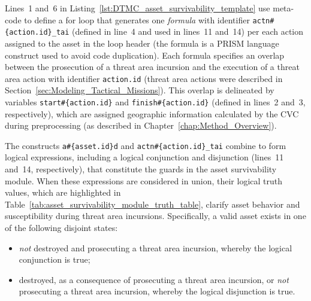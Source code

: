 Lines~1 and~6 in Listing~\ref{lst:DTMC_asset_survivability_template} use meta-code to define a for loop that generates one \emph{formula} with identifier \texttt{actn\#\{action.id\}\_tai} (defined in line~4 and used in lines~11 and~14) per each action assigned to the asset in the loop header (the formula is a PRISM language construct used to avoid code duplication). Each formula specifies an overlap between the prosecution of a threat area incursion and the execution of a threat area action with identifier \texttt{action.id} (threat area actions were described in Section~\ref{sec:Modeling_Tactical_Missions}). This overlap is delineated by variables \texttt{start\#\{action.id\}} and \texttt{finish\#\{action.id\}} (defined in lines~2 and~3, respectively), which are assigned geographic information calculated by the CVC during preprocessing (as described in Chapter~\ref{chap:Method_Overview}).

The constructs \texttt{a\#\{asset.id\}d} and \texttt{actn\#\{action.id\}\_tai} combine to form logical expressions, including a logical conjunction and disjunction (lines~11 and~14, respectively), that constitute the guards in the asset survivability module. When these expressions are considered in union, their logical truth values, which are highlighted in Table~\ref{tab:asset_survivability_module_truth_table}, clarify asset behavior and susceptibility during threat area incursions. Specifically, a valid asset exists in one of the following disjoint states:

\begin{itemize}

\item \emph{not} destroyed and prosecuting a threat area incursion, whereby the logical conjunction is true;

\item destroyed, as a consequence of prosecuting a threat area incursion, or \emph{not} prosecuting a threat area incursion, whereby the logical disjunction is true.

\end{itemize}

